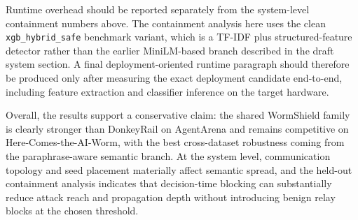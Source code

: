\documentclass[10pt]{article}
\begin{document}
Runtime overhead should be reported separately from the system-level containment numbers above. The containment analysis here uses the clean \texttt{xgb\_hybrid\_safe} benchmark variant, which is a TF-IDF plus structured-feature detector rather than the earlier MiniLM-based branch described in the draft system section. A final deployment-oriented runtime paragraph should therefore be produced only after measuring the exact deployment candidate end-to-end, including feature extraction and classifier inference on the target hardware.

Overall, the results support a conservative claim: the shared WormShield family is clearly stronger than DonkeyRail on AgentArena and remains competitive on Here-Comes-the-AI-Worm, with the best cross-dataset robustness coming from the paraphrase-aware semantic branch. At the system level, communication topology and seed placement materially affect semantic spread, and the held-out containment analysis indicates that decision-time blocking can substantially reduce attack reach and propagation depth without introducing benign relay blocks at the chosen threshold.
\end{document}
